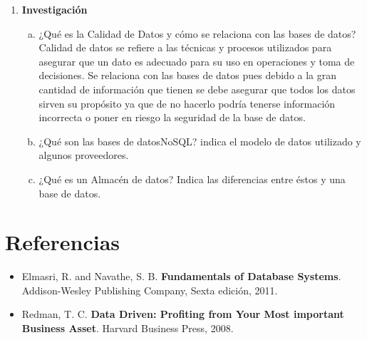 \documentclass[letterpaper,11pt]{article}
\begin{document}
\begin{enumerate}
\begin{enumerate}[a. ]
    \end{enumerate}

    \item \textbf{Investigación}
    \begin{enumerate}[a)]

        \item ¿Qué es la Calidad de Datos y cómo se relaciona con las bases de datos?\\
	Calidad de datos se refiere a las técnicas y procesos utilizados para asegurar que un dato es adecuado para su uso en operaciones y toma de decisiones. Se relaciona con las bases de datos pues debido a la gran cantidad de información que tienen se debe asegurar que todos los datos sirven su propósito ya que de no hacerlo podría tenerse información incorrecta o poner en riesgo la seguridad de la base de datos.

        \item ¿Qué son las bases de datosNoSQL? indica el modelo de datos utilizado y algunos proveedores.

        \item ¿Qué es un Almacén de datos? Indica las diferencias entre éstos y una base de datos.

    \end{enumerate}
\end{enumerate}

\section*{Referencias}
\begin{itemize}
	
	\item Elmasri, R. and Navathe, S. B. \textbf{Fundamentals of Database Systems}. Addison-Wesley Publishing Company, Sexta edición, 2011.
	\item Redman, T. C. \textbf{Data Driven: Profiting from Your Most important Business Asset}. Harvard Business Press, 2008.

\end{itemize}
\end{document}

